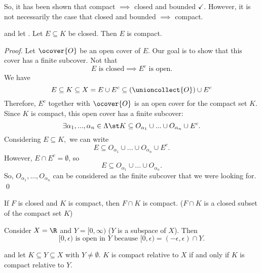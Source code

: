 \documentclass[a4paper]{article}
\begin{document}
	\begin{note}
			So, it has been shown that compact $\implies$ closed and bounded $\checkmark$. However, it is not necessarily the case that closed and bounded $\implies$ compact.
	\end{note}
	
	\begin{theorem}
		\routineMS and let \routineCompact. Let $E\subseteq K$ be closed. Then $E$ is compact.
	\end{theorem}
	
	\begin{proof}
		Let $\ocover{O}$ be an open cover of $E$. Our goal is to show that this cover has a finite subcover. Not that $$E \text{ is closed} \implies E^c \text{ is open}.$$
		We have $$E \subseteq K \subseteq X = E\cup E^c \subseteq \left(\unioncollect{O}\right) \cup E^c$$
		Therefore, $E^c$ together with $\ocover{O}$ is an open cover for the compact set $K$. Since $K$ is compact, this open cover has a finite subcover:
		$$\exists \alpha_1,...,\alpha_n \in \Lambda \st K\subseteq O_{\alpha_1} \cup ... \cup O_{\alpha_n} \cup E^c.$$
		Considering $E\subseteq K,$ we can write
		$$E \subseteq O_{\alpha_1}\cup ... \cup O_{\alpha_n} \cup E^c.$$
		However, $E\cap E^c = \emptyset$, so
		$$E \subseteq O_{\alpha_1} \cup... \cup O_{\alpha_n}.$$
		So, $O_{\alpha_1} ,... , O_{\alpha_n}$ can be considered as the finite subcover that we were looking for. \qed
	\end{proof}
	
	\begin{corollary}
		If $F$ is closed and $K$ is compact, then $F\cap K$ is compact. ($F\cap K$ is a closed subset of the compact set $K$)
	\end{corollary}
	
	Consider $X=\R$ and $Y=[0, \infty)$ ($Y$ is a subspace of $X$). Then
	$$[0, \epsilon) \text{ is open in } Y \text{ because } [0,\epsilon) = (-\epsilon, \epsilon)\cap Y.$$
	
	\begin{theorem}
		\routineMS and let $K\subseteq Y \subseteq X$ with $Y \not = \emptyset$. $K$ is compact relative to $X$ if and only if $K$ is compact relative to $Y$.
	\end{theorem}
	
\end{document}
